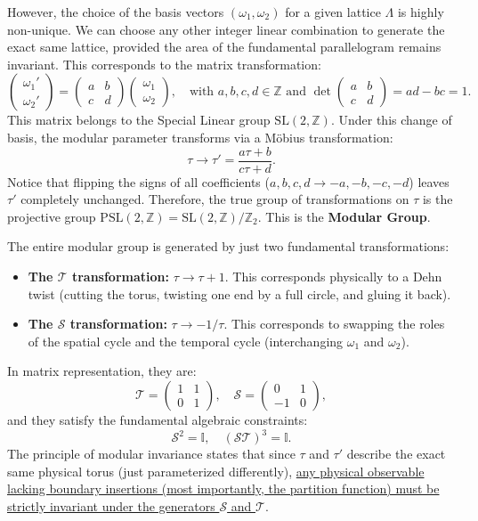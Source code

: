 However, the choice of the basis vectors \((\omega_1, \omega_2)\) for a given lattice \(\Lambda\) is highly non-unique. We can choose any other integer linear combination to generate the exact same lattice, provided the area of the fundamental parallelogram remains invariant. This corresponds to the matrix transformation:
\[
    \begin{pmatrix}
        \omega_1' \\
        \omega_2'
    \end{pmatrix} = \begin{pmatrix}
        a & b \\
        c & d
    \end{pmatrix} \begin{pmatrix}
        \omega_1 \\
        \omega_2
    \end{pmatrix}, \quad \text{with } a,b,c,d \in \mathbb{Z} \text{ and } \det\begin{pmatrix} a & b \\ c & d \end{pmatrix} = ad - bc = 1.
\]
This matrix belongs to the Special Linear group \(\mathrm{SL}(2, \mathbb{Z})\). Under this change of basis, the modular parameter transforms via a Möbius transformation:
\[
    \tau \to \tau' = \frac{a\tau + b}{c\tau + d}.
\]
Notice that flipping the signs of all coefficients (\(a,b,c,d \to -a,-b,-c,-d\)) leaves \(\tau'\) completely unchanged. Therefore, the true group of transformations on \(\tau\) is the projective group \(\mathrm{PSL}(2, \mathbb{Z}) = \mathrm{SL}(2, \mathbb{Z}) / \mathbb{Z}_2\). This is the \textbf{Modular Group}.

The entire modular group is generated by just two fundamental transformations:
\begin{itemize}
    \item \textbf{The \(\mathcal{T}\) transformation:} \(\tau \to \tau + 1\). This corresponds physically to a Dehn twist (cutting the torus, twisting one end by a full circle, and gluing it back).
    \item \textbf{The \(\mathcal{S}\) transformation:} \(\tau \to -1/\tau\). This corresponds to swapping the roles of the spatial cycle and the temporal cycle (interchanging \(\omega_1\) and \(\omega_2\)).
\end{itemize}
In matrix representation, they are:
\[
    \mathcal{T} = \begin{pmatrix} 1 & 1 \\ 0 & 1 \end{pmatrix}, \quad \mathcal{S} = \begin{pmatrix} 0 & 1 \\ -1 & 0 \end{pmatrix},
\]
and they satisfy the fundamental algebraic constraints:
\[
    \mathcal{S}^2 = \mathbb{I}, \quad (\mathcal{S}\mathcal{T})^3 = \mathbb{I}.
\]
The principle of modular invariance states that since \(\tau\) and \(\tau'\) describe the exact same physical torus (just parameterized differently), \uline{any physical observable lacking boundary insertions (most importantly, the partition function) must be strictly invariant under the generators \(\mathcal{S}\) and \(\mathcal{T}\)}.


